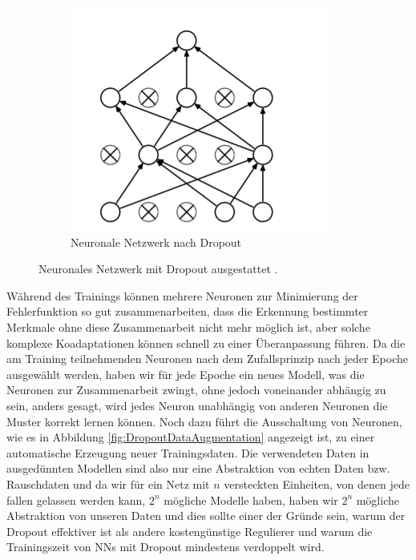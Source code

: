 \documentclass[12pt,a4paper]{scrartcl}
\numberwithin{equation}{section}
\begin{document}
\begin{figure}[h!]
\begin{subfigure}{.5\textwidth}
		\includegraphics[width=.8\linewidth, height=\linewidth, scale=2]{dropout2.png}
		\caption{Neuronale Netzwerk nach Dropout}
		\label{fig:dropout2}
	\end{subfigure}
	\caption{Neuronales Netzwerk mit Dropout ausgestattet \cite{3}.}
	\label{fig:Dropout}
\end{figure}

Während des Trainings können mehrere Neuronen zur Minimierung der Fehlerfunktion so gut zusammenarbeiten, dass die Erkennung bestimmter Merkmale ohne diese Zusammenarbeit nicht mehr möglich ist, aber solche komplexe Koadaptationen  können schnell zu einer Überanpassung führen. Da die am Training teilnehmenden Neuronen nach dem Zufallsprinzip nach jeder Epoche ausgewählt werden, haben wir für jede Epoche ein neues Modell, was die Neuronen zur Zusammenarbeit zwingt, ohne jedoch voneinander abhängig zu sein, anders gesagt, wird jedes Neuron unabhängig von anderen Neuronen die Muster korrekt lernen können.
Noch dazu führt die Ausschaltung von Neuronen, wie es in Abbildung \ref{fig:DropoutDataAugmentation} angezeigt ist, zu einer automatische Erzeugung neuer Trainingsdaten. Die verwendeten Daten in ausgedünnten Modellen sind also nur eine Abstraktion von echten Daten bzw. Rauschdaten und da wir für ein Netz mit $ n $ versteckten Einheiten, von denen jede fallen gelassen werden kann, $ 2^n $ mögliche Modelle haben, haben wir $ 2^n $ mögliche Abstraktion von unseren Daten und dies sollte einer der Gründe sein, warum der Dropout effektiver ist als andere kostengünstige Regulierer\cite{3} und warum die Trainingszeit von \acsp{NN} mit Dropout mindestens verdoppelt wird. 
	
\end{document}
